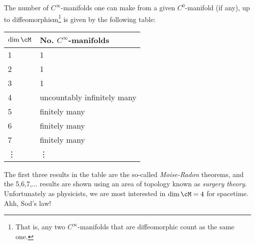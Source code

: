 \bt 
    The number of $C^{\infty}$-manifolds one can make from a given $C^0$-manifold (if any), up to diffeomorphism\footnote{That is, any two $C^{\infty}$-manifolds that are diffeomorphic count as the same one.} is given by the following table:
    \begin{center}
	    \begin{tabular}{@{} p{2.5cm}p{5cm}@{}}
		    \toprule
		    $\dim\cM$ & No. $C^{\infty}$-manifolds \\
		    \midrule 
		    1 & 1 \\
		    2 & 1 \\
		    3 & 1 \\
		    4 &  uncountably infinitely many\\
		    5 & finitely many \\
		    6 & finitely many \\
		    7 & finitely many \\
		    \vdots & \vdots \\
		    \bottomrule
	    \end{tabular}
    \end{center}
\et 

\noindent The first three results in the table are the so-called \textit{Moise-Radon} theorems, and the 5,6,7,... results are shown using an area of topology known as \textit{surgery theory}. Unfortunately as physicists, we are most interested in $\dim\cM=4$ for spacetime. Ahh, Sod's law!
